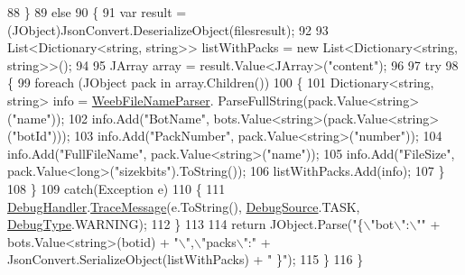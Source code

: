 \begin{DoxyCode}
88             \}
89             \textcolor{keywordflow}{else}
90             \{
91                 var result = (JObject)JsonConvert.DeserializeObject(filesresult);
92 
93                 List<Dictionary<string, string>> listWithPacks = \textcolor{keyword}{new} List<Dictionary<string, string>>();
94 
95                 JArray array = result.Value<JArray>(\textcolor{stringliteral}{"content"});        
96 
97                 \textcolor{keywordflow}{try}
98                 \{
99                     \textcolor{keywordflow}{foreach} (JObject pack \textcolor{keywordflow}{in} array.Children())
100                     \{
101                         Dictionary<string, string> info = \mbox{\hyperlink{class_little_weeb_library_1_1_handlers_1_1_nibl_handler_a0aae159f51f737bbb89946b8fe8c8743}{WeebFileNameParser}}.
      ParseFullString(pack.Value<\textcolor{keywordtype}{string}>(\textcolor{stringliteral}{"name"}));
102                         info.Add(\textcolor{stringliteral}{"BotName"},  bots.Value<\textcolor{keywordtype}{string}>(pack.Value<\textcolor{keywordtype}{string}>(\textcolor{stringliteral}{"botId"})));
103                         info.Add(\textcolor{stringliteral}{"PackNumber"}, pack.Value<\textcolor{keywordtype}{string}>(\textcolor{stringliteral}{"number"}));
104                         info.Add(\textcolor{stringliteral}{"FullFileName"}, pack.Value<\textcolor{keywordtype}{string}>(\textcolor{stringliteral}{"name"}));
105                         info.Add(\textcolor{stringliteral}{"FileSize"}, pack.Value<\textcolor{keywordtype}{long}>(\textcolor{stringliteral}{"sizekbits"}).ToString());
106                         listWithPacks.Add(info);
107                     \}
108                 \}
109                 \textcolor{keywordflow}{catch}(Exception e)
110                 \{
111                     \mbox{\hyperlink{class_little_weeb_library_1_1_handlers_1_1_nibl_handler_a334c2111588fa71d1203bd8cbb572970}{DebugHandler}}.\mbox{\hyperlink{interface_little_weeb_library_1_1_handlers_1_1_i_debug_handler_a2e405bc3492e683cd3702fae125221bc}{TraceMessage}}(e.ToString(), 
      \mbox{\hyperlink{namespace_little_weeb_library_1_1_handlers_a2a6ca0775121c9c503d58aa254d292be}{DebugSource}}.TASK, \mbox{\hyperlink{namespace_little_weeb_library_1_1_handlers_ab66019ed40462876ec4e61bb3ccb0a62}{DebugType}}.WARNING);
112                 \}
113 
114                 \textcolor{keywordflow}{return} JObject.Parse(\textcolor{stringliteral}{"\{\(\backslash\)"bot\(\backslash\)":\(\backslash\)""} + bots.Value<\textcolor{keywordtype}{string}>(botid) + \textcolor{stringliteral}{"\(\backslash\)",\(\backslash\)"packs\(\backslash\)":"} + 
      JsonConvert.SerializeObject(listWithPacks) + \textcolor{stringliteral}{" \}"});
115             \}
116         \}
\end{DoxyCode}
